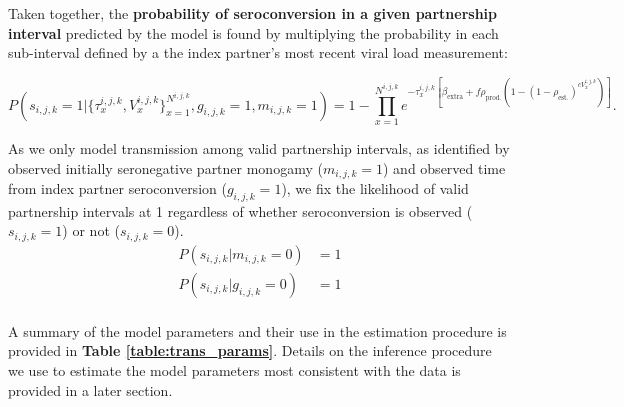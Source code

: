 \documentclass{article}[11pt]
\begin{document}
Taken together, the \textbf{probability of seroconversion in a given partnership interval} predicted by the model is found by multiplying the probability in each sub-interval defined by a the index partner's most recent viral load measurement: 

\begin{footnotesize}
\begin{equation}
P(s_{i,j,k}=1|\{\tau_{x}^{i,j,k}, V^{i,j,k}_x\}_{x=1}^{N^{i,j,k}},
g_{i,j,k} = 1, m_{i,j,k}=1) = 
1- \prod_{x=1}^{N^{i,j,k}} e^{-\tau_x^{i,j,k}\left[\beta_\text{extra}+f \rho_{\text{prod.}} \left(1-\left(1-\rho_{\text{est.}}\right)^{c V^{i,j,k}_{x}}\right)\right]}.
\end{equation}
\end{footnotesize}

As we only model transmission among valid partnership intervals, as identified by observed initially seronegative partner monogamy ($m_{i,j,k} = 1$) and observed time from index partner seroconversion ($g_{i,j,k}=1$), we fix the likelihood of valid partnership intervals at 1 regardless of whether seroconversion is observed ($s_{i,j,k}=1$) or not ($s_{i,j,k}=0$). 
\begin{align}
P(s_{i,j,k}|m_{i,j,k}=0) &= 1 \\
P(s_{i,j,k}|g_{i,j,k}=0) &= 1 \\
\end{align}

A summary of the model parameters and their use in the estimation procedure is provided in \textbf{Table \ref{table:trans_params}}. Details on the inference procedure we use to estimate the model parameters most consistent with the data is provided in a later section. 
\end{document}
